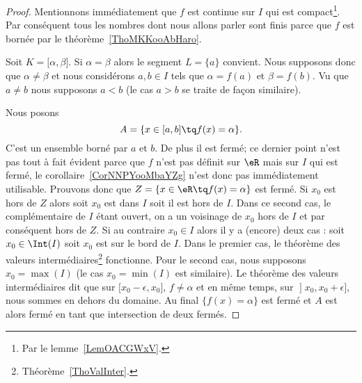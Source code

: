 \begin{proof}
    Mentionnons immédiatement que \( f\) est continue sur \( I\) qui est compact\footnote{Par le lemme~\ref{LemOACGWxV}.}. Par conséquent tous les nombres dont nous allons parler sont finis parce que \( f\) est bornée par le théorème~\ref{ThoMKKooAbHaro}.

    Soit \( K=\mathopen[ \alpha , \beta \mathclose]\). Si \( \alpha=\beta\) alors le segment \( L=\{ a \}\) convient. Nous supposons donc que \( \alpha\neq \beta\) et nous considérons \( a,b\in I\) tels que \( \alpha=f(a)\) et \( \beta=f(b)\). Vu que \( a\neq b\) nous supposons \( a<b\) (le cas \( a>b\) se traite de façon similaire).

    Nous posons
    \begin{equation}
        A=\{ x\in\mathopen[ a , b \mathclose]\tq f(x)=\alpha \}.
    \end{equation}
    C'est un ensemble borné par \( a\) et \( b\). De plus il est fermé; ce dernier point n'est pas tout à fait évident parce que \( f\) n'est pas définit sur \( \eR\) mais sur \( I\) qui est fermé, le corollaire~\ref{CorNNPYooMbaYZg} n'est donc pas immédiatement utilisable. Prouvons donc que \( Z=\{ x\in \eR\tq f(x)=\alpha \}\) est fermé. Si \( x_0\) est hors de \( Z\) alors soit \( x_0\) est dans \( I\) soit il est hors de \( I\). Dans ce second cas, le complémentaire de \( I\) étant ouvert, on a un voisinage de \( x_0\) hors de \( I\) et par conséquent hors de \( Z\). Si au contraire \( x_0\in I\) alors il y a (encore) deux cas : soit \( x_0\in\Int(I)\) soit \( x_0\) est sur le bord de \( I\). Dans le premier cas, le théorème des valeurs intermédiaires\footnote{Théorème~\ref{ThoValInter}.} fonctionne. Pour le second cas, nous supposons \( x_0=\max(I)\) (le cas \( x_0=\min(I)\) est similaire). Le théorème des valeurs intermédiaires dit que sur \( \mathopen[ x_0-\epsilon , x_0 \mathclose]\), \( f\neq \alpha\) et en même temps, sur \( \mathopen] x_0 , x_0+\epsilon \mathclose]\), nous sommes en dehors du domaine. Au final \( \{ f(x)=\alpha \}\) est fermé et \( A\) est alors fermé en tant que intersection de deux fermés.


\end{proof}
